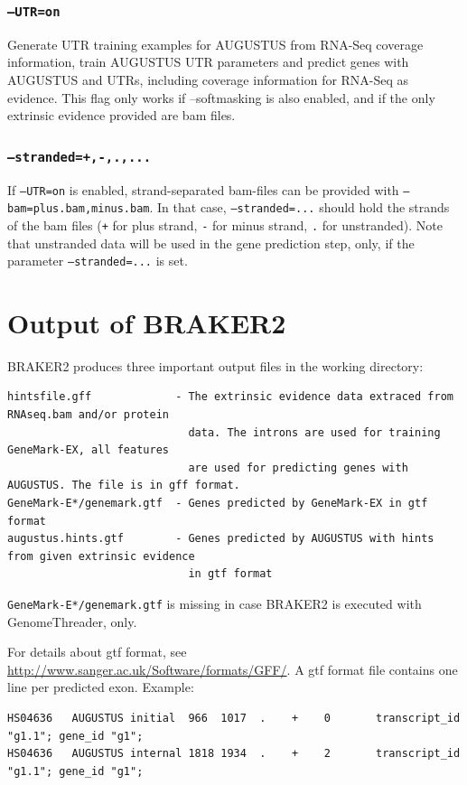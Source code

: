 \documentclass[a4paper,10pt]{report}
\begin{document}
\subsection{\texttt{--UTR=on}} Generate UTR training examples for AUGUSTUS from RNA-Seq coverage information, train AUGUSTUS UTR parameters and predict genes with AUGUSTUS and UTRs, including coverage information for RNA-Seq as evidence. This flag only works if --softmasking is also enabled, and if the only extrinsic evidence provided are bam files.

\subsection{\texttt{--stranded=+,-,.,...}} If \texttt{--UTR=on} is enabled, strand-separated bam-files can be provided with \texttt{--bam=plus.bam,minus.bam}. In that case, \texttt{--stranded=...} should hold the strands of the bam files (\texttt{+} for plus strand, \texttt{-} for minus strand, \texttt{.} for unstranded). Note that unstranded data will be used in the gene prediction step, only, if the parameter \texttt{--stranded=...} is set.

\chapter{Output of BRAKER2}

BRAKER2 produces three important output files in the working directory:

\begin{verbatim}
hintsfile.gff             - The extrinsic evidence data extraced from RNAseq.bam and/or protein
                            data. The introns are used for training GeneMark-EX, all features
                            are used for predicting genes with AUGUSTUS. The file is in gff format.
GeneMark-E*/genemark.gtf  - Genes predicted by GeneMark-EX in gtf format
augustus.hints.gtf        - Genes predicted by AUGUSTUS with hints from given extrinsic evidence
                            in gtf format
\end{verbatim}

\texttt{GeneMark-E*/genemark.gtf} is missing in case BRAKER2 is executed with GenomeThreader, only.

For details about gtf format, see \url{http://www.sanger.ac.uk/Software/formats/GFF/}. A gtf format file
contains one line per predicted exon. Example:

\begin{verbatim}
HS04636   AUGUSTUS initial  966  1017  .    +    0       transcript_id "g1.1"; gene_id "g1";
HS04636   AUGUSTUS internal 1818 1934  .    +    2       transcript_id "g1.1"; gene_id "g1";
\end{verbatim}
\end{document}
